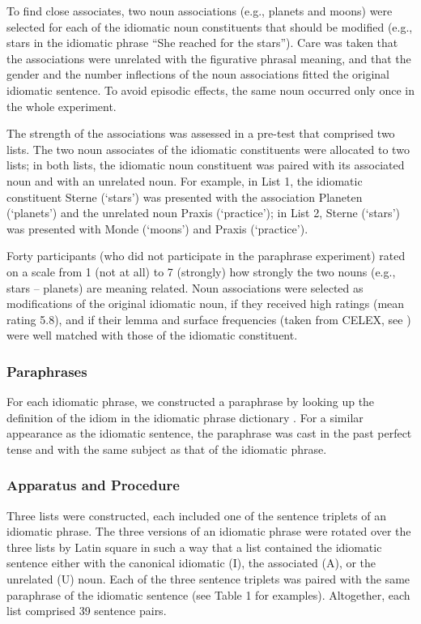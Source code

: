\documentclass[output=paper]{langsci/langscibook}
\begin{document}
To find close associates, two noun associations (e.g., planets and moons) were selected for each of the idiomatic noun constituents that should be modified (e.g., stars in the idiomatic phrase “She reached for the stars”). Care was taken that the associations were unrelated with the figurative phrasal meaning, and that the gender and the number inflections of the noun associations fitted the original idiomatic sentence. To avoid episodic effects, the same noun occurred only once in the whole experiment.

The strength of the associations was assessed in a pre-test that comprised two lists. The two noun associates of the idiomatic constituents were allocated to two lists; in both lists, the idiomatic noun constituent was paired with its associated noun and with an unrelated noun.  For example, in List 1, the idiomatic constituent Sterne (‘stars’) was presented with the association Planeten (‘planets’) and the unrelated noun Praxis (‘practice’); in List 2, Sterne (‘stars’) was presented with Monde (‘moons’) and Praxis (‘practice’).

Forty participants (who did not participate in the paraphrase experiment) rated on a scale from 1 (not at all) to 7 (strongly) how strongly the two nouns (e.g., stars – planets) are meaning related. Noun associations were selected as modifications of the original idiomatic noun, if they received high ratings (mean rating 5.8), and if their lemma and surface frequencies (taken from CELEX, see \citet{baayen:1993}) were well matched with those of the idiomatic constituent. 

\subsubsection{Paraphrases} 
For each idiomatic phrase, we constructed a paraphrase by looking up the definition of the idiom in the idiomatic phrase dictionary \citep{redewendungen:2002}. For a similar appearance as the idiomatic sentence, the paraphrase was cast in the past perfect tense and with the same subject as that of the idiomatic phrase. 

\subsubsection{Apparatus and Procedure}
Three lists were constructed, each included one of the sentence triplets of an idiomatic phrase.  The three versions of an idiomatic phrase were rotated over the three lists by Latin square in such a way that a list contained the idiomatic sentence either with the canonical idiomatic (I), the associated (A), or the unrelated (U) noun. Each of the three sentence triplets was paired with the same paraphrase of the idiomatic sentence (see Table 1 for examples). Altogether, each list comprised 39 sentence pairs. 
\end{document}
